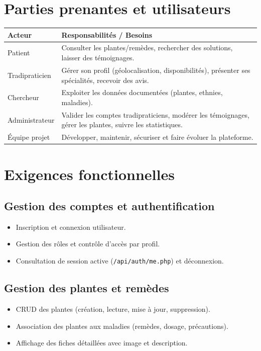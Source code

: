 \documentclass[12pt,a4paper]{article}
\begin{document}
\section{Parties prenantes et utilisateurs}
\begin{longtable}{p{3.5cm}p{11cm}}
\toprule
\textbf{Acteur} & \textbf{Responsabilités / Besoins} \\
\midrule
Patient & Consulter les plantes/remèdes, rechercher des solutions, laisser des témoignages. \\
Tradipraticien & Gérer son profil (géolocalisation, disponibilités), présenter ses spécialités, recevoir des avis. \\
Chercheur & Exploiter les données documentées (plantes, ethnies, maladies). \\
Administrateur & Valider les comptes tradipraticiens, modérer les témoignages, gérer les plantes, suivre les statistiques. \\
Équipe projet & Développer, maintenir, sécuriser et faire évoluer la plateforme. \\
\bottomrule
\end{longtable}

\section{Exigences fonctionnelles}
\subsection{Gestion des comptes et authentification}
\begin{itemize}[leftmargin=1.2cm]
  \item Inscription et connexion utilisateur.
  \item Gestion des rôles et contrôle d'accès par profil.
  \item Consultation de session active (\texttt{/api/auth/me.php}) et déconnexion.
\end{itemize}

\subsection{Gestion des plantes et remèdes}
\begin{itemize}[leftmargin=1.2cm]
  \item CRUD des plantes (création, lecture, mise à jour, suppression).
  \item Association des plantes aux maladies (remèdes, dosage, précautions).
  \item Affichage des fiches détaillées avec image et description.
\end{itemize}
\end{document}
